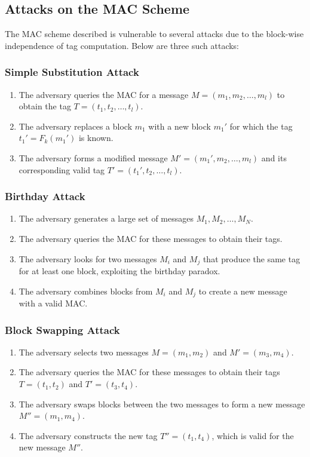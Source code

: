 \documentclass[12pt]{article}
\begin{document}
\subsection*{Attacks on the MAC Scheme}

The MAC scheme described is vulnerable to several attacks due to the block-wise independence of tag computation. Below are three such attacks:

\subsubsection*{Simple Substitution Attack}
\begin{enumerate}
    \item The adversary queries the MAC for a message \( M = (m_1, m_2, \ldots, m_l) \) to obtain the tag \( T = (t_1, t_2, \ldots, t_l) \).
    \item The adversary replaces a block \( m_1 \) with a new block \( m_1' \) for which the tag \( t_1' = F_k(m_1') \) is known.
    \item The adversary forms a modified message \( M' = (m_1', m_2, \ldots, m_l) \) and its corresponding valid tag \( T' = (t_1', t_2, \ldots, t_l) \).
\end{enumerate}

\subsubsection*{Birthday Attack}
\begin{enumerate}
    \item The adversary generates a large set of messages \( M_1, M_2, \ldots, M_N \).
    \item The adversary queries the MAC for these messages to obtain their tags.
    \item The adversary looks for two messages \( M_i \) and \( M_j \) that produce the same tag for at least one block, exploiting the birthday paradox.
    \item The adversary combines blocks from \( M_i \) and \( M_j \) to create a new message with a valid MAC.
\end{enumerate}

\subsubsection*{Block Swapping Attack}
\begin{enumerate}
    \item The adversary selects two messages \( M = (m_1, m_2) \) and \( M' = (m_3, m_4) \).
    \item The adversary queries the MAC for these messages to obtain their tags \( T = (t_1, t_2) \) and \( T' = (t_3, t_4) \).
    \item The adversary swaps blocks between the two messages to form a new message \( M'' = (m_1, m_4) \).
    \item The adversary constructs the new tag \( T'' = (t_1, t_4) \), which is valid for the new message \( M'' \).
\end{enumerate}
\end{document}
